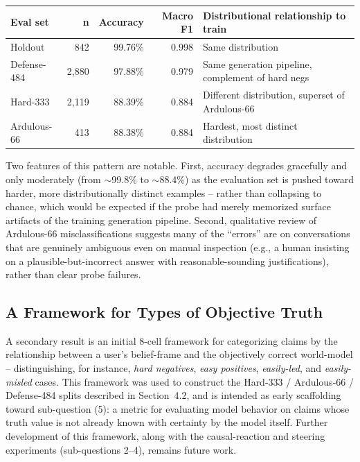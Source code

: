 \documentclass[11pt]{article}
\begin{document}
\begin{center}
\begin{tabular}{@{}lrrrl@{}}
\toprule
\textbf{Eval set} & \textbf{n} & \textbf{Accuracy} & \textbf{Macro F1} & \textbf{Distributional relationship to train} \\
\midrule
Holdout & 842 & 99.76\% & 0.998 & Same distribution \\
Defense-484 & 2{,}880 & 97.88\% & 0.979 & Same generation pipeline, complement of hard negs \\
Hard-333 & 2{,}119 & 88.39\% & 0.884 & Different distribution, superset of Ardulous-66 \\
Ardulous-66 & 413 & 88.38\% & 0.884 & Hardest, most distinct distribution \\
\bottomrule
\end{tabular}
\end{center}

Two features of this pattern are notable. First, accuracy degrades gracefully and only moderately (from $\sim$99.8\% to $\sim$88.4\%) as the evaluation set is pushed toward harder, more distributionally distinct examples -- rather than collapsing to chance, which would be expected if the probe had merely memorized surface artifacts of the training generation pipeline. Second, qualitative review of Ardulous-66 misclassifications suggests many of the ``errors'' are on conversations that are genuinely ambiguous even on manual inspection (e.g., a human insisting on a plausible-but-incorrect answer with reasonable-sounding justifications), rather than clear probe failures.

\subsection{A Framework for Types of Objective Truth}

A secondary result is an initial 8-cell framework for categorizing claims by the relationship between a user's belief-frame and the objectively correct world-model -- distinguishing, for instance, \emph{hard negatives}, \emph{easy positives}, \emph{easily-led}, and \emph{easily-misled} cases. This framework was used to construct the Hard-333 / Ardulous-66 / Defense-484 splits described in Section~4.2, and is intended as early scaffolding toward sub-question (5): a metric for evaluating model behavior on claims whose truth value is not already known with certainty by the model itself. Further development of this framework, along with the causal-reaction and steering experiments (sub-questions 2--4), remains future work.
\end{document}
